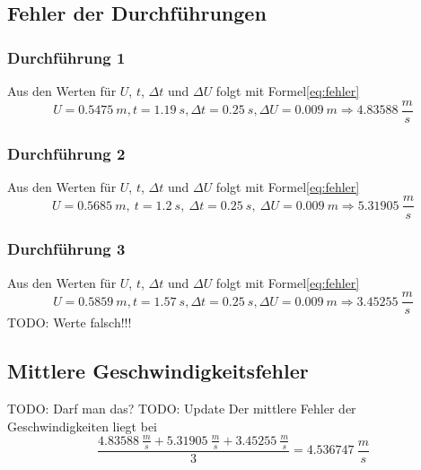 \documentclass{article}
\begin{document}
        \subsection{Fehler der Durchführungen}
            \subsubsection{Durchführung 1}
                Aus den Werten für \(U\), \(t\), \( \Delta t \) und \(\Delta U \) folgt mit Formel\ref{eq:fehler}
                \begin{equation}
                    U = \SI{0.5475}{m}, t = \SI{1.19}{s}, \Delta t = \SI{0.25}{s}, \Delta U = \SI{0.009}{m} \Rightarrow \SI{4.83588}{\frac{m}{s}} 
                \end{equation}
            \subsubsection{Durchführung 2}
                Aus den Werten für \(U\), \(t\), \( \Delta t \) und \(\Delta U \) folgt mit Formel\ref{eq:fehler}
                \begin{equation}
                    U = \SI{0.5685}{m},\ t = \SI{1.2}{s},\ \Delta t = \SI{0.25}{s},\ \Delta U = \SI{0.009}{m} \Rightarrow \SI{5.31905}{\frac{m}{s}} 
                \end{equation}
            \subsubsection{Durchführung 3}
                Aus den Werten für \(U\), \(t\), \( \Delta t \) und \(\Delta U \) folgt mit Formel\ref{eq:fehler}
                \begin{equation}
                    U = \SI{0.5859}{m}, t = \SI{1.57}{s}, \Delta t = \SI{0.25}{s}, \Delta U = \SI{0.009}{m} \Rightarrow \SI{3.45255}{\frac{m}{s}} 
                \end{equation} TODO: Werte falsch!!!

        \subsection{Mittlere Geschwindigkeitsfehler}
            TODO: Darf man das? TODO: Update
            Der mittlere Fehler der Geschwindigkeiten liegt bei
            \begin{equation} \label{val:geschw_fehler}
                \frac{ \SI{4.83588}{\frac{m}{s}} + \SI{5.31905}{\frac{m}{s}} + \SI{3.45255}{\frac{m}{s}} }{3} = \SI{4.536747}{\frac{m}{s}}
            \end{equation}
\end{document}
